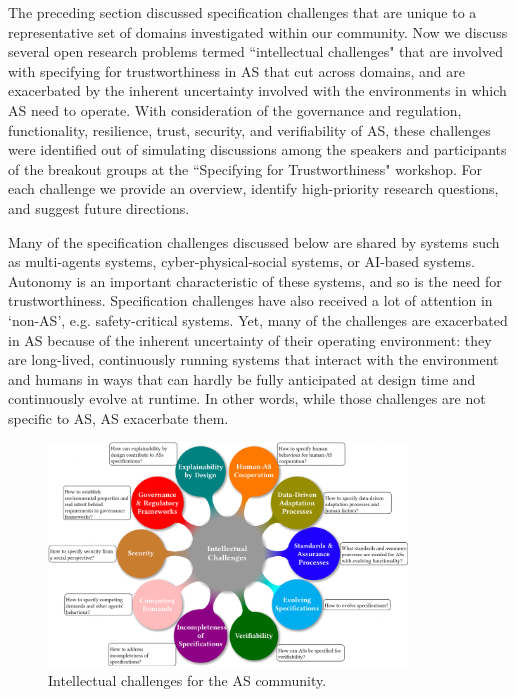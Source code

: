 \documentclass[sigconf,nonacm]{acmart}%
\begin{document}
The preceding section discussed specification challenges that are unique to a representative set of domains investigated within our community. Now we discuss several open research problems termed ``intellectual challenges" that are involved with specifying for trustworthiness in AS that cut across domains, and are exacerbated by the inherent uncertainty involved with the environments in which AS need to operate. With consideration of the governance and regulation, functionality, resilience, trust, security, and verifiability of AS, these challenges were identified out of simulating discussions among the speakers and participants of the breakout groups at the ``Specifying for Trustworthiness" workshop. For each challenge we provide an overview, identify high-priority research questions, and suggest future directions.


Many of the specification challenges discussed below are shared by systems such as multi-agents systems, cyber-physical-social systems, or AI-based systems. Autonomy is an important characteristic of these systems, and so is the need for trustworthiness. Specification challenges have also received a lot of attention in ‘non-AS’, e.g. safety-critical systems. Yet, many of the challenges are exacerbated in AS because of the inherent uncertainty of their operating environment: they are long-lived, continuously running systems that interact with the environment and humans in ways that can hardly be fully anticipated at design time and continuously evolve at runtime. In other words, while those challenges are not specific to AS, AS exacerbate them.
	
	\begin{figure}
		\centering
		\includegraphics[width=0.85\textwidth]{figures/Intellectual-Challenges.png}%
		\caption{Intellectual challenges for the AS community.}
		\label{Intellectual-challenges}
	\end{figure}		
	
\end{document}
